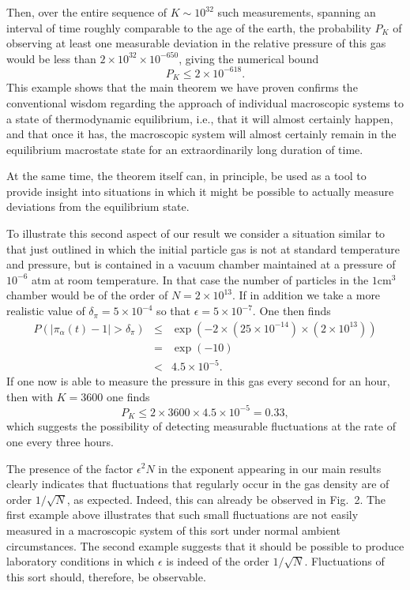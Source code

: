 \documentclass{article}
\numberwithin{equation}{section}
\begin{document}
Then, over the entire sequence of $K \sim 10^{32}$ such measurements, spanning
an interval of time roughly comparable to the age of the earth, the probability $P_{K}$
of observing at least one measurable deviation in the relative pressure of this
gas would be less than $2\times 10^{32}\times 10^{-650}$, giving the numerical bound
\begin{equation*}
P_{K} \leq 2\times10^{-618}.
\end{equation*}
This example shows
that the main theorem we have proven confirms the conventional wisdom regarding the
approach of individual macroscopic systems to a state of thermodynamic equilibrium, i.e.,
that it will almost certainly happen, and that once it has, the macroscopic system will almost
certainly remain in the equilibrium macrostate state for an extraordinarily long duration of time.

At the same time, the theorem itself can, in principle, be used as a
tool to provide insight into situations in which it might be possible to actually
measure deviations from the equilibrium state.

To illustrate this second aspect of our result we consider a situation similar to
that just outlined in which the initial particle gas is not at standard temperature
and pressure, but is contained in a vacuum chamber maintained at a pressure of $10^{-6}$ atm at room temperature. In that case the number of particles in
the $1\mathrm{cm}^3$ chamber would be of the order of $N= 2\times 10^{13}$. If in addition we take a more realistic value of $\delta_\pi=5\times 10^{-4}$ so that $\epsilon=5\times 10^{-7}$. One then finds
\begin{eqnarray*}
P\left( \left\vert \pi _{\alpha }\left( t\right) -1\right\vert >\delta_\pi
\right)&\leq &\exp \left( -2\times (25\times 10^{-14})\times\left( 2\times 10^{13}\right) \right)  \\
&=&\exp \left( -10\right)  \\
&<&4.5\times 10^{-5} .
\end{eqnarray*}
If one now is able to measure the pressure in this gas every second for an hour,
then with $K=3600$ one finds $$P_K\leq 2\times3600\times4.5\times10^{-5}=0.33,
$$
which suggests the possibility of detecting measurable fluctuations at
the rate of one every three hours.

The presence of the factor $\epsilon^2N$ in the exponent appearing in our main results clearly indicates that fluctuations that regularly occur in the gas density are of order $1/\sqrt N$, as expected. Indeed, this can already be observed in Fig.~2. The first example above illustrates that such small fluctuations are not easily measured in a macroscopic system of this sort under normal ambient circumstances. The second example suggests that it should be possible to produce laboratory conditions in which $\epsilon$ is indeed of the order $1/\sqrt N$. Fluctuations of this sort should, therefore, be observable.
\end{document}
